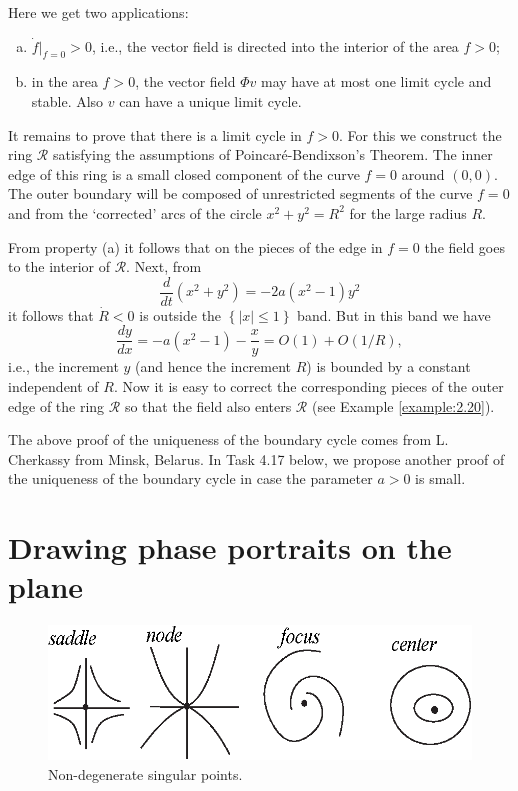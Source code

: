 \begin{example}
 	Here we get two applications:
 	\begin{enumerate}[(a)]
 		\item $\dot{f}|_{f=0}>0$, i.e., the vector field is directed into the interior of the area $f> 0$;
 		\item in the area $ f> 0 $, the vector field $\Phi v$ may have at most one limit cycle and stable. Also $v$ can have a unique limit cycle.
 	\end{enumerate}
 
 	It remains to prove that there is a limit cycle in $f> 0$. For this we construct the ring $ \mathcal {R} $ satisfying the assumptions of Poincaré-Bendixson's Theorem. The inner edge of this ring is a small closed component of the curve $f = 0$ around $(0, 0)$. The outer boundary will be composed of unrestricted segments of the curve $f = 0$ and from the `corrected' arcs of the circle  $x^{2}+y^{2}=R^{2}$ for the large radius $R$.
 	
 	From property (a) it follows that on the pieces of the edge in $f = 0$ the field goes to the interior of $\mathcal{R}$. Next, from
 	$$
 	\frac{d}{dt}\left( x^{2}+y^{2}\right) =-2a\left( x^{2}-1\right) y^{2}
 	$$
 	it follows that $ \dot {R} <0 $ is outside the $\left\{ \left\vert x\right\vert \leq 1\right\}$ band. But in this band we have
 	$$
 	\frac{dy}{dx}=-a(x^{2}-1)-\frac{x}{y}=O(1)+O(1/R),
 	$$
 	i.e., the increment $y$ (and hence the increment $R$) is bounded by a constant independent of $R$. Now it is easy to correct the corresponding pieces of the outer edge of the ring $\mathcal{R}$ so that the field also enters $\mathcal{R}$ (see Example \ref{example:2.20}).
 	
 	The above proof of the uniqueness of the boundary cycle comes from L. Cherkassy from Minsk, Belarus. In Task 4.17 below, we propose another proof of the uniqueness of the boundary cycle in case the parameter $a> 0$ is small.
\end{example}

\section{Drawing phase portraits on the plane} \label{sec:2.4}

\begin{figure}[!ht]
	\centering
	\includegraphics [scale=1.3]{jtr217}
	\caption{Non-degenerate singular points.}
	\label{fig:2.17}
\end{figure}

